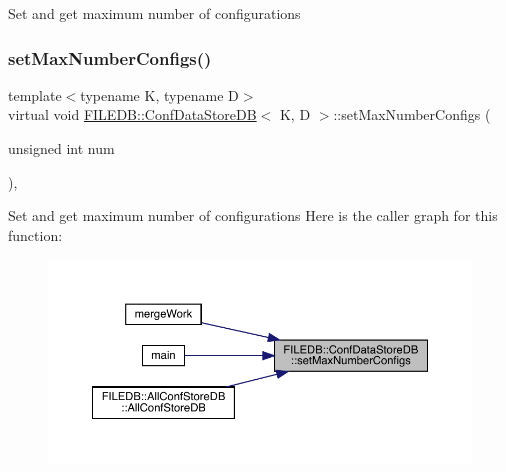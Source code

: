 Set and get maximum number of configurations \mbox{\label{classFILEDB_1_1ConfDataStoreDB_acd6f44fc7a83322417ad1a7ea7d2b6ea}} 
\subsubsection{\texorpdfstring{setMaxNumberConfigs()}{setMaxNumberConfigs()}\hspace{0.1cm}{\footnotesize\ttfamily [2/3]}}
{\footnotesize\ttfamily template$<$typename K, typename D$>$ \\
virtual void \mbox{\hyperlink{classFILEDB_1_1ConfDataStoreDB}{F\+I\+L\+E\+D\+B\+::\+Conf\+Data\+Store\+DB}}$<$ K, D $>$\+::set\+Max\+Number\+Configs (\begin{DoxyParamCaption}\item[{unsigned int}]{num }\end{DoxyParamCaption})\hspace{0.3cm}{\ttfamily [inline]}, {\ttfamily [virtual]}}

Set and get maximum number of configurations Here is the caller graph for this function\+:
\nopagebreak
\begin{figure}[H]
\begin{center}
\leavevmode
\includegraphics[width=350pt]{d8/d19/classFILEDB_1_1ConfDataStoreDB_acd6f44fc7a83322417ad1a7ea7d2b6ea_icgraph}
\end{center}
\end{figure}
\mbox{\label{classFILEDB_1_1ConfDataStoreDB_acd6f44fc7a83322417ad1a7ea7d2b6ea}} 
